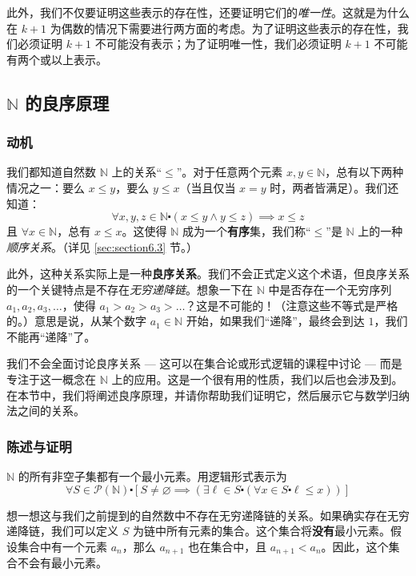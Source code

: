 此外，我们不仅要证明这些表示的存在性，还要证明它们的\emph{唯一性}。这就是为什么在 $k+1$ 为偶数的情况下需要进行两方面的考虑。为了证明这些表示的存在性，我们必须证明 $k+1$ 不可能没有表示；为了证明唯一性，我们必须证明 $k+1$ 不可能有两个或以上表示。

\subsection{$\mathbb{N}$ 的良序原理}

\subsubsection*{动机}

我们都知道自然数 $\mathbb{N}$ 上的关系``$\le$''。对于任意两个元素 $x, y \in \mathbb{N}$，总有以下两种情况之一：要么 $x \le y$，要么 $y \le x$（当且仅当 $x = y$ 时，两者皆满足）。我们还知道：
\[\forall x, y, z \in \mathbb{N} \centerdot (x \le y \land y \le z) \implies x \le z\]
且 $\forall x \in \mathbb{N}$，总有 $x \le x$。这使得 $\mathbb{N}$ 成为一个\textbf{有序}集，我们称``$\le$''是 $\mathbb{N}$ 上的一种\emph{顺序关系}。（详见 \ref{sec:section6.3} 节。）

此外，这种关系实际上是一种\textbf{良序关系}。我们不会正式定义这个术语，但良序关系的一个关键特点是不存在\emph{无穷递降链}。想象一下在 $\mathbb{N}$ 中是否存在一个无穷序列 $a_1, a_2, a_3, \dots$，使得 $a_1 > a_2 > a_3 > \dots$？这是不可能的！（注意这些不等式是严格的。）意思是说，从某个数字 $a_1 \in \mathbb{N}$ 开始，如果我们``递降''，最终会到达 $1$，我们不能再``递降''了。

我们不会全面讨论良序关系 --- 这可以在集合论或形式逻辑的课程中讨论 --- 而是专注于这一概念在 $\mathbb{N}$ 上的应用。这是一个很有用的性质，我们以后也会涉及到。在本节中，我们将阐述良序原理，并请你帮助我们证明它，然后展示它与数学归纳法之间的关系。

\subsubsection*{陈述与证明}

\begin{theorem}
    $\mathbb{N}$ 的所有非空子集都有一个最小元素。用逻辑形式表示为
    \[\forall S \in \mathcal{P}(\mathbb{N}) \centerdot [S \ne \varnothing \implies (\exists \ell \in S \centerdot (\forall x \in S \centerdot \ell \le x))]\]
\end{theorem}

想一想这与我们之前提到的自然数中不存在无穷递降链的关系。如果确实存在无穷递降链，我们可以定义 $S$ 为链中所有元素的集合。这个集合将\textbf{没有}最小元素。假设集合中有一个元素 $a_n$，那么 $a_{n+1}$ 也在集合中，且 $a_{n+1} < a_n$。因此，这个集合不会有最小元素。


